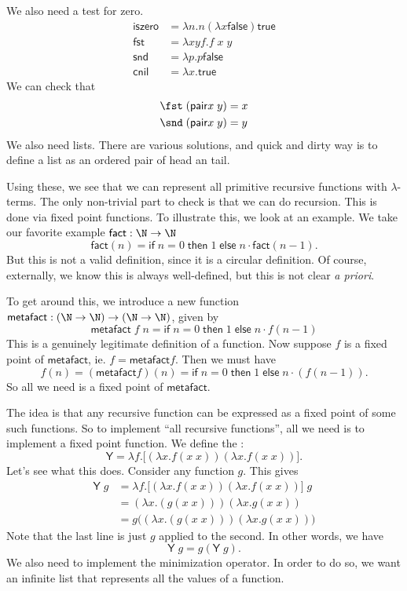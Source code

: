 \documentclass[a4paper]{article}
\newcommand\pair{\mathsf{pair}}
\newcommand\cif{\mathsf{if}\;}
\newcommand\cthen{\;\mathsf{then}\;}
\newcommand\celse{\;\mathsf{else}\;}
\newcommand\ctrue{\mathsf{true}}
\newcommand\cfalse{\mathsf{false}}
\newcommand\ciszero{\mathsf{iszero}}
\newcommand\cfst{\mathsf{fst}}
\newcommand\csnd{\mathsf{snd}}
\newcommand\cnil{\mathsf{cnil}}
\newcommand\cfact{\mathsf{fact}}
\newcommand\metafact{\mathsf{metafact}}
\newcommand\Yc{\mathsf{Y}}
\begin{document}
We also need a test for zero.
\begin{align*}
  \ciszero &= \lambda n. n (\lambda x \cfalse) \ctrue\\
  \cfst &= \lambda x y f. f\; x\; y\\
  \csnd &= \lambda p. p \cfalse\\
  \cnil &= \lambda x. \ctrue
\end{align*}
We can check that
\begin{align*}
  \fst\; (\pair x\; y) &= x\\
  \snd\; (\pair x\; y) &= y
\end{align*}
We also need lists. There are various solutions, and quick and dirty way is to define a list as an ordered pair of head an tail.

Using these, we see that we can represent all primitive recursive functions with $\lambda$-terms. The only non-trivial part to check is that we can do recursion. This is done via fixed point functions. To illustrate this, we look at an example. We take our favorite example $\cfact: \N \to \N$
\[
  \cfact(n) = \cif n = 0 \cthen 1 \celse n \cdot \cfact (n - 1).
\]
But this is not a valid definition, since it is a circular definition. Of course, externally, we know this is always well-defined, but this is not clear \emph{a priori}.

To get around this, we introduce a new function $\metafact: (\N \to \N) \to (\N \to \N)$, given by
\[
  \metafact\; f\; n = \cif n = 0 \cthen 1 \celse n \cdot f(n - 1)
\]
This is a genuinely legitimate definition of a function. Now suppose $f$ is a fixed point of $\metafact$, ie. $f = \metafact f$. Then we must have
\[
  f(n) = (\metafact f)(n) = \cif n = 0\cthen 1 \celse n \cdot (f(n - 1)).
\]
So all we need is a fixed point of $\metafact$.

The idea is that any recursive function can be expressed as a fixed point of some such functions. So to implement ``all recursive functions'', all we need is to implement a fixed point function. We define the \term{$\Yc$-combinator}:
\[
  \Yc = \lambda f. \Big[ (\lambda x. f(x\; x)) (\lambda x. f(x\; x))\Big].
\]
Let's see what this does. Consider any function $g$. This gives
\begin{align*}
  \Yc\; g &= \lambda f. \Big[ (\lambda x. f(x\; x)) (\lambda x. f(x\; x))\Big]\; g\\
  &= (\lambda x. (g(x\; x))) (\lambda x . g(x\; x))\\
  &= g\Big((\lambda x. (g(x\; x))) (\lambda x . g(x\; x))\Big)
\end{align*}
Note that the last line is just $g$ applied to the second. In other words, we have
\[
  \Yc\; g = g (\Yc\; g).
\]
We also need to implement the minimization operator. In order to do so, we want an infinite list that represents all the values of a function.
\end{document}

